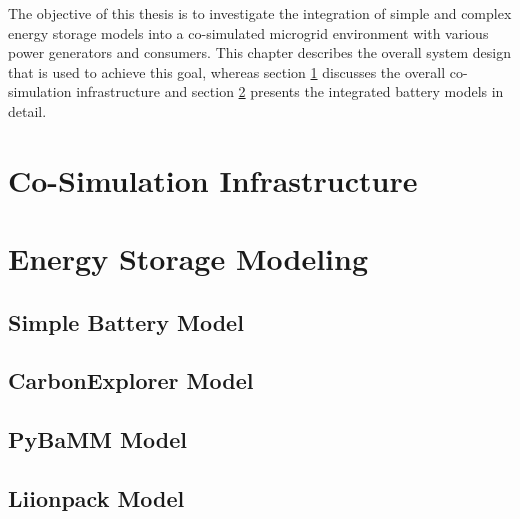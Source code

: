 The objective of this thesis is to investigate the integration of simple and complex energy storage models into a co-simulated microgrid environment with various power generators and consumers. This chapter describes the overall system design that is used to achieve this goal, whereas section \ref{co_simulation_infrastructure} discusses the overall co-simulation infrastructure and section \ref{energy_storage_modeling} presents the integrated battery models in detail.
\section{Co-Simulation Infrastructure}
\label{co_simulation_infrastructure}
\section{Energy Storage Modeling}
\label{energy_storage_modeling}
\subsection{Simple Battery Model}
\subsection{CarbonExplorer Model}
\subsection{PyBaMM Model}
\subsection{Liionpack Model}